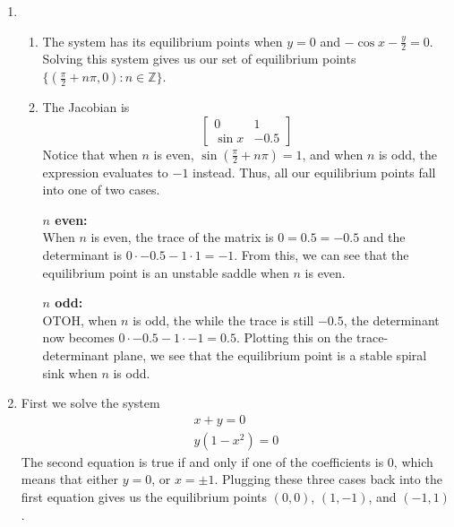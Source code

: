 \documentclass[12pt]{article}
\begin{document}
\begin{enumerate}
    \item \begin{enumerate}
              \item The system has its equilibrium points when $y=0$ and $-\cos x-\frac{y}{2}=0$.
                    Solving this system gives us our set of equilibrium points
                    $\{\left(\frac{\pi}{2}+n\pi, 0\right): n \in \mathbb{Z}\}$.
              \item The Jacobian is
                    \[\begin{bmatrix}
                            0      & 1    \\
                            \sin x & -0.5
                        \end{bmatrix}\]
                    Notice that when $n$ is even, $\sin \left(\frac{\pi}{2}+n\pi\right)=1$,
                    and when $n$ is odd, the expression evaluates to $-1$ instead.
                    Thus, all our equilibrium points fall into one of two cases.

                    \textbf{$n$ even:} \\
                    When $n$ is even, the trace of the matrix is $0=0.5=-0.5$
                    and the determinant is $0 \cdot -0.5 - 1 \cdot 1=-1$.
                    From this, we can see that the equilibrium point is
                    an unstable saddle when $n$ is even.

                    \textbf{$n$ odd:} \\
                    OTOH, when $n$ is odd, the while the trace is still $-0.5$,
                    the determinant now becomes $0 \cdot -0.5 - 1 \cdot -1=0.5$.
                    Plotting this on the trace-determinant plane,
                    we see that the equilibrium point is
                    a stable spiral sink when $n$ is odd.
          \end{enumerate}
    \item First we solve the system
          \begin{gather*}
              x+y=0 \\
              y(1-x^2)=0
          \end{gather*}
          The second equation is true if and only if one of the coefficients
          is $0$, which means that either $y=0$, or $x=\pm 1$.
          Plugging these three cases back into the first equation gives us
          the equilibrium points $(0, 0)$, $(1, -1)$, and $(-1, 1)$.


\end{enumerate}
\end{document}

